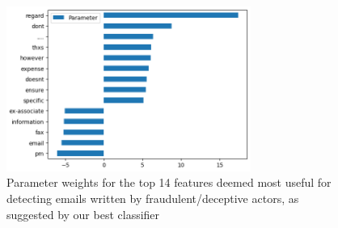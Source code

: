 \begin{figure}[t!]
    \centering
    \includegraphics[width=8cm]{images/important_word_plot.png}
    \caption{Parameter weights for the top 14 features deemed most useful for detecting emails written by fraudulent/deceptive actors, as suggested by our best classifier}
    \label{fig:features}
\end{figure}

